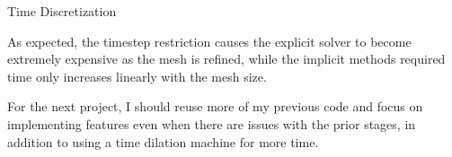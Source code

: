 \documentclass{article}
\begin{document}
\begin{section}{Time Discretization}
\begin{table}[ht]
  \caption{Compute time required to reach $t=1.0$}
  \label{timing}
\end{table}

As expected, the timestep restriction causes the explicit solver to become extremely expensive as the mesh is refined,
while the implicit methods required time only increases linearly with the mesh size.

For the next project, I should reuse more of my previous code and focus on implementing features even when there are issues with the prior stages,
in addition to using a time dilation machine for more time.
\end{section}
\end{document}
